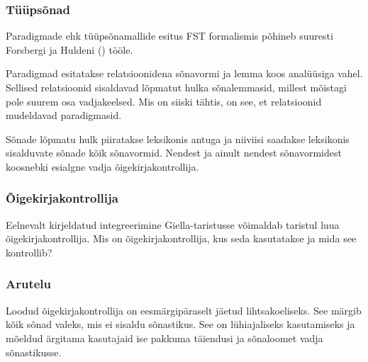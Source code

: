 \documentclass[12pt,a4paper]{article}
\begin{document}
\subsubsection{Tüüpsõnad}
\label{sec:giella-tüüpsõnad}

Paradigmade ehk tüüpsõnamallide esitus FST formalismis põhineb suuresti Forsbergi ja Huldeni (\citeyear{forsberg_learning_2016}) tööle.

Paradigmad esitatakse relatsioonidena sõnavormi ja lemma koos analüüsiga vahel. Sellised relatsioonid sisaldavad lõpmatut hulka sõnalemmasid, millest mõistagi pole suurem osa vadjakeelsed. Mis on siiski tähtis, on see, et relatsioonid mudeldavad paradigmasid.

Sõnade lõpmatu hulk piiratakse leksikonis antuga ja niiviisi saadakse leksikonis sisalduvate sõnade kõik sõnavormid. Nendest ja ainult nendest sõnavormidest koosnebki esialgne vadja õigekirja\-kontrollija.

\subsubsection{Õigekirjakontrollija}
\label{sec:giella-õigekirjakontrollija}

Eelnevalt kirjeldatud integreerimine Giella-taristusse võimaldab taristul luua õigekirjakontrollija. Mis on õigekirjakontrollija, kus seda kasutatakse ja mida see kontrollib?

\subsubsection{Arutelu}
\label{sec:giella-arutelu}

Loodud õigekirjakontrollija on eesmärgipäraselt jäetud lihtsakoeliseks. See märgib kõik sõnad valeks, mis ei sisaldu sõnastikus. See on lühiajaliseks kasutamiseks ja mõeldud ärgitama kasutajaid ise pakkuma täiendusi ja sõnaloomet vadja sõnastikusse.





\end{document}
